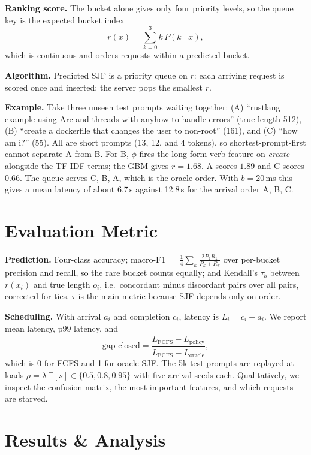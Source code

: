 \documentclass[10pt,twocolumn]{article}
\begin{document}
\textbf{Ranking score.} The bucket alone gives only four priority levels, so the queue key is the expected bucket index
\[ r(x) = \textstyle\sum_{k=0}^{3} k \, P(k \mid x), \]
which is continuous and orders requests within a predicted bucket.

\textbf{Algorithm.} Predicted SJF is a priority queue on $r$: each arriving request is scored once and inserted; the server pops the smallest $r$.

\textbf{Example.} Take three unseen test prompts waiting together: (A) ``rustlang example using Arc and threads with anyhow to handle errors'' (true length 512), (B) ``create a dockerfile that changes the user to non-root'' (161), and (C) ``how am i?'' (55). All are short prompts (13, 12, and 4 tokens), so shortest-prompt-first cannot separate A from B. For B, $\phi$ fires the long-form-verb feature on \emph{create} alongside the TF-IDF terms; the GBM gives $r = 1.68$. A scores $1.89$ and C scores $0.66$. The queue serves C, B, A, which is the oracle order. With $b = 20$\,ms this gives a mean latency of about 6.7\,s against 12.8\,s for the arrival order A, B, C.

\section{Evaluation Metric}
\textbf{Prediction.} Four-class accuracy; macro-F1 $= \frac14\sum_k \frac{2 P_k R_k}{P_k + R_k}$ over per-bucket precision and recall, so the rare bucket counts equally; and Kendall's $\tau_b$ between $r(x_i)$ and true length $o_i$, i.e.\ concordant minus discordant pairs over all pairs, corrected for ties. $\tau$ is the main metric because SJF depends only on order.

\textbf{Scheduling.} With arrival $a_i$ and completion $c_i$, latency is $L_i = c_i - a_i$. We report mean latency, p99 latency, and
\[ \text{gap closed} = \frac{\bar L_{\text{FCFS}} - \bar L_{\text{policy}}}{\bar L_{\text{FCFS}} - \bar L_{\text{oracle}}}, \]
which is 0 for FCFS and 1 for oracle SJF. The 5k test prompts are replayed at loads $\rho = \lambda\,\mathbb{E}[s] \in \{0.5, 0.8, 0.95\}$ with five arrival seeds each. Qualitatively, we inspect the confusion matrix, the most important features, and which requests are starved.

\section{Results \& Analysis}
\label{sec:results}
\end{document}
